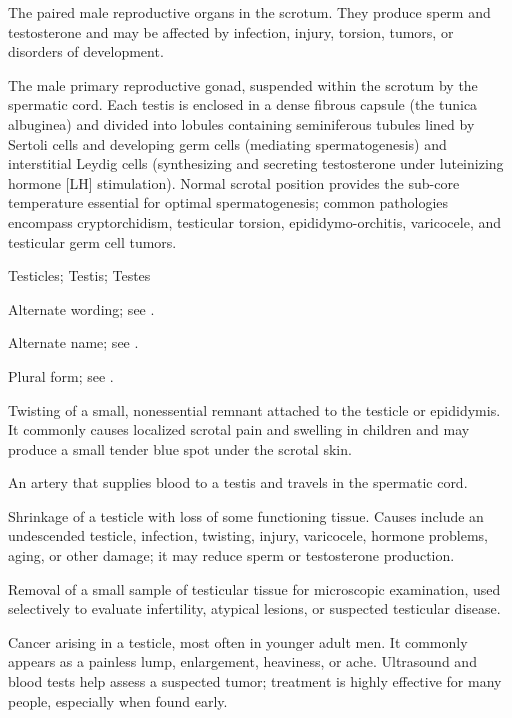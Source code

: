  The paired male reproductive organs in the scrotum. They produce sperm and testosterone and may be affected by infection, injury, torsion, tumors, or disorders of development.

 The male primary reproductive gonad, suspended within the scrotum by the spermatic cord. Each testis is enclosed in a dense fibrous capsule (the tunica albuginea) and divided into lobules containing seminiferous tubules lined by Sertoli cells and developing germ cells (mediating spermatogenesis) and interstitial Leydig cells (synthesizing and secreting testosterone under luteinizing hormone [LH] stimulation). Normal scrotal position provides the sub-core temperature essential for optimal spermatogenesis; common pathologies encompass cryptorchidism, testicular torsion, epididymo-orchitis, varicocele, and testicular germ cell tumors.

\synonyms
Testicles; Testis; Testes

 Alternate wording; see .

 Alternate name; see .

 Plural form; see .

 Twisting of a small, nonessential remnant attached to the testicle or epididymis. It commonly causes localized scrotal pain and swelling in children and may produce a small tender blue spot under the scrotal skin.

 An artery that supplies blood to a testis and travels in the spermatic cord.

 Shrinkage of a testicle with loss of some functioning tissue. Causes include an undescended testicle, infection, twisting, injury, varicocele, hormone problems, aging, or other damage; it may reduce sperm or testosterone production.

 Removal of a small sample of testicular tissue for microscopic examination, used selectively to evaluate infertility, atypical lesions, or suspected testicular disease.

 Cancer arising in a testicle, most often in younger adult men. It commonly appears as a painless lump, enlargement, heaviness, or ache. Ultrasound and blood tests help assess a suspected tumor; treatment is highly effective for many people, especially when found early.

